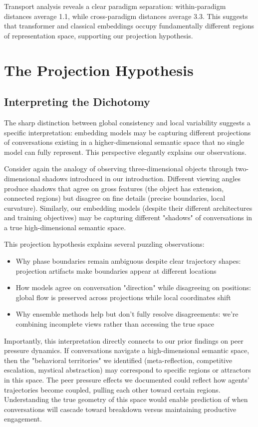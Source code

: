 \documentclass[11pt,letterpaper]{article}
\begin{document}
Transport analysis reveals a clear paradigm separation: within-paradigm distances average 1.1, while cross-paradigm distances average 3.3. This suggests that transformer and classical embeddings occupy fundamentally different regions of representation space, supporting our projection hypothesis.
\section{The Projection Hypothesis}

\subsection{Interpreting the Dichotomy}

The sharp distinction between global consistency and local variability suggests a specific interpretation: embedding models may be capturing different projections of conversations existing in a higher-dimensional semantic space that no single model can fully represent. This perspective elegantly explains our observations.

Consider again the analogy of observing three-dimensional objects through two-dimensional shadows introduced in our introduction. Different viewing angles produce shadows that agree on gross features (the object has extension, connected regions) but disagree on fine details (precise boundaries, local curvature). Similarly, our embedding models (despite their different architectures and training objectives) may be capturing different "shadows" of conversations in a true high-dimensional semantic space.

This projection hypothesis explains several puzzling observations:
\begin{itemize}
\item Why phase boundaries remain ambiguous despite clear trajectory shapes: projection artifacts make boundaries appear at different locations
\item How models agree on conversation "direction" while disagreeing on positions: global flow is preserved across projections while local coordinates shift
\item Why ensemble methods help but don't fully resolve disagreements: we're combining incomplete views rather than accessing the true space
\end{itemize}

Importantly, this interpretation directly connects to our prior findings on peer pressure dynamics. If conversations navigate a high-dimensional semantic space, then the "behavioral territories" we identified (meta-reflection, competitive escalation, mystical abstraction) may correspond to specific regions or attractors in this space. The peer pressure effects we documented could reflect how agents' trajectories become coupled, pulling each other toward certain regions. Understanding the true geometry of this space would enable prediction of when conversations will cascade toward breakdown versus maintaining productive engagement.
\end{document}

